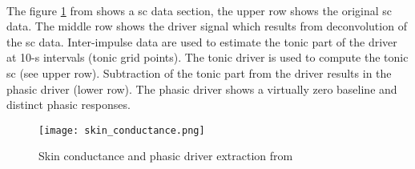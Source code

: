 \\
The figure \ref{fig:skin_conductance} from \cite{benedek2010continuous} shows a \gls{sc} data section, the upper row shows the original \gls{sc} data. The middle row shows the driver signal which results from deconvolution of the \gls{sc} data. Inter-impulse data are used to estimate the tonic part of the driver at 10-s intervals (tonic grid points). The tonic driver is used to compute the tonic \gls{sc} (see upper row). Subtraction of the tonic part from the driver results in the phasic driver (lower row). The phasic driver shows a virtually zero baseline and distinct phasic responses. 
\begin{figure}[h]
    \centering
    \texttt{[image: skin\_conductance.png]} 
	\caption{Skin conductance and phasic driver extraction from \cite{benedek2010continuous}}
    \label{fig:skin_conductance}
\end{figure}

